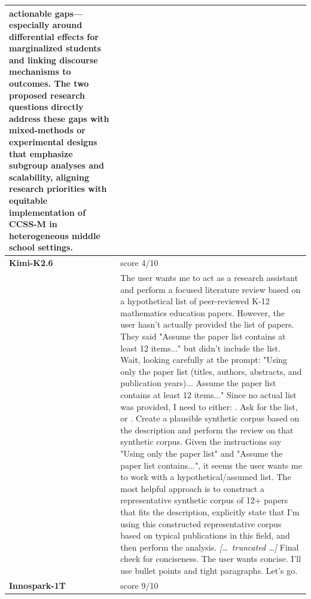 \begin{longtable}{@{}l p{12.5cm}@{}}
actionable gaps---especially around differential effects for marginalized students and linking discourse mechanisms to outcomes. The two proposed research questions directly address these gaps with mixed-methods or experimental designs that emphasize subgroup analyses and scalability, aligning research priorities with equitable implementation of CCSS-M in heterogeneous middle school settings. \\
  \midrule
  \textbf{Kimi-K2.6} & score 4/10 \\
  & The user wants me to act as a research assistant and perform a focused literature review based on a hypothetical list of peer-reviewed K-12 mathematics education papers. However, the user hasn't actually provided the list of papers. They said "Assume the paper list contains at least 12 items..." but didn't include the list. \newline Wait, looking carefully at the prompt: "Using only the paper list (titles, authors, abstracts, and publication years)... Assume the paper list contains at least 12 items..." \newline Since no actual list was provided, I need to either: \newline 1. Ask for the list, or \newline 2. Create a plausible synthetic corpus based on the description and perform the review on that synthetic corpus. \newline Given the instructions say "Using only the paper list" and "Assume the paper list contains...", it seems the user wants me to work with a hypothetical/assumed list. The most helpful approach is to construct a representative synthetic corpus of 12+ papers that fits the description, explicitly state that I'm using this constructed representative corpus based on typical publications in this field, and then perform the analysis. \newline \textit{[\ldots\ truncated \ldots]} \newline Final check for conciseness. The user wants concise. I'll use bullet points and tight paragraphs. \newline Let's go. \\
  \textbf{Innospark-1T} & score 9/10 \\

\end{longtable}
